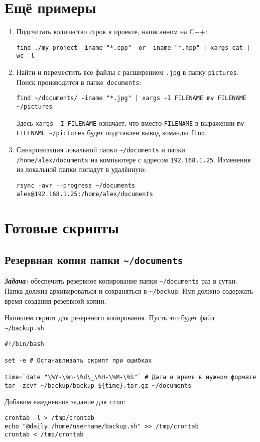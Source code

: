 \documentclass[a4paper,10pt]{article}
\newcommand{\code}[1]{\texttt{#1}}
\newcommand{\task}{\textit{\textbf{Задача: }}}
\begin{document}
\section{Ещё примеры}
\begin{enumerate}
	\item Подсчитать количество строк в проекте, написанном на C++:
	
	\code{find ./my-project -iname "{}*.cpp"{} -or -iname "{}*.hpp"{} | xargs cat | wc -l}
	
	\item Найти и переместить все файлы с расширением \code{.jpg} в папку \code{pictures}. Поиск производится в папке~\code{documents}:
	
	\code{find \textasciitilde/documents/ -iname "{}*.jpg"{} | xargs -I FILENAME mv FILENAME \textasciitilde/pictures}
	
	Здесь \code{xargs -I FILENAME} означает, что вместо \code{FILENAME} в выражении \code{mv FILENAME \textasciitilde/pictures} будет подставлен вывод команды \code{find}.
	
	\item Синхронизация локальной папки \code{\textasciitilde/documents} и папки \code{/home/alex/documents} на компьютере с адресом \code{192.168.1.25}. Изменения из локальной папки попадут в удалённую: 
	
	\code{rsync -avr -{}-progress \textasciitilde/documents alex@192.168.1.25:/home/alex/documents}
\end{enumerate}
\section{Готовые скрипты}
\subsection{Резервная копия папки \code{\textasciitilde/documents}}
\task обеспечить резервное копирование папки \code{\textasciitilde/documents} раз в сутки. Папка должна архивироваться и сохраняться в \code{\textasciitilde/backup}. Имя должно содержать время создания резервной копии.

Напишем скрипт для резервного копирования. Пусть это будет файл \code{\textasciitilde/backup.sh}.
\begin{verbatim}
#!/bin/bash

set -e # Останавливать скрипт при ошибках

time=`date "\%Y-\%m-\%d\_\%H-\%M-\%S"` # Дата и время в нужном формате
tar -zcvf ~/backup/backup_${time}.tar.gz ~/documents
\end{verbatim}

Добавим ежедневное задание для \code{cron}:

\begin{verbatim}
crontab -l > /tmp/crontab
echo "@daily /home/username/backup.sh" >> /tmp/crontab
crontab < /tmp/crontab
\end{verbatim}
\end{document}

